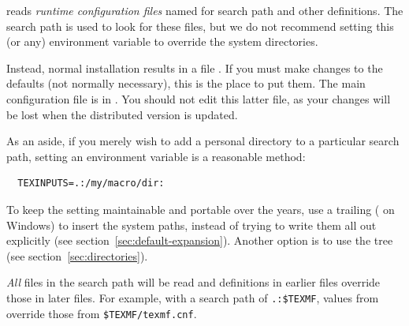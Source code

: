 \documentclass[12pt]{article}
\begin{document}
\KPS{} reads \emph{runtime configuration files} named 
for search path and other definitions.  The search path
 is used to look for these files, but we do not
recommend setting this (or any) environment variable to override the
system directories.

Instead, normal installation results in a file
.  If you must make changes to the defaults
(not normally necessary), this is the place to put them.  The main
configuration file is in .
You should not edit this latter file, as your changes will be lost when
the distributed version is updated.

As an aside, if you merely wish to add a personal directory to a
particular search path, setting an environment variable is a reasonable
method:
\begin{verbatim}
  TEXINPUTS=.:/my/macro/dir:
\end{verbatim}
To keep the setting maintainable and portable over the years, use a
trailing \samp{:} (\samp{;} on Windows) to insert the system paths,
instead of trying to write them all out explicitly (see
section~\ref{sec:default-expansion}). Another option is to use the
 tree (see section~\ref{sec:directories}).

\emph{All}  files in the search path will be read and
definitions in earlier files override those in later files.  For
example, with a search path of \verb|.:$TEXMF|, values from
 override those from \verb|$TEXMF/texmf.cnf|.
\end{document}
